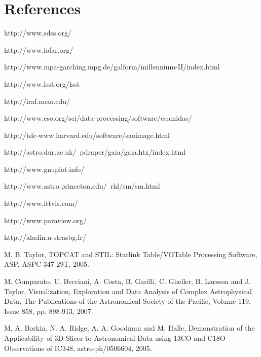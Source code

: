 \section*{References}


\begin{thebibliography}{00}








 http://www.sdss.org/

 http://www.lofar.org/

http://www.mpa-garching.mpg.de/galform/millennium-II/index.html

http://www.lsst.org/lsst

 http://iraf.noao.edu/

 http://www.eso.org/sci/data-processing/software/esomidas/

 http://tdc-www.harvard.edu/software/saoimage.html

 http://astro.dur.ac.uk/~pdraper/gaia/gaia.htx/index.html

 http://www.gnuplot.info/

 http://www.astro.princeton.edu/~rhl/sm/sm.html

 http://www.ittvis.com/


 http://www.paraview.org/

 http://aladin.u-strasbg.fr/

 M. B. Taylor, TOPCAT and STIL: Starlink Table/VOTable Processing Software, ASP, ASPC 347 29T, 2005.

M. Comparato, U. Becciani, A. Costa, B. Garilli, C. Gheller, B. Larsson and J. Taylor, Visualization, Exploration and Data Analysis of Complex Astrophysical Data,  The Publications of the Astronomical Society of the Pacific, Volume 119, Issue 858, pp. 898-913, 2007.

 M. A. Borkin, N. A. Ridge, A. A. Goodman and M. Halle, Demonstration of the Applicability of 3D Slicer to Astronomical Data using 13CO and C18O Observations of IC348, astro-ph/0506604, 2005.


\end{thebibliography}
